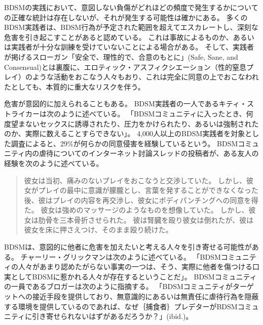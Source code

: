 \documentclass[paper=a4,book,openany]{jlreq}
\begin{document}
BDSMの実践において、意図しない負傷がどれほどの頻度で発生するかについての正確な統計は存在しないが、それが発生する可能性は確かにある。
多くのBDSM実践者は、BDSM行為が予定された範囲を超えてエスカレートし、深刻な危害を引き起こすことがあると認めている\citep[cf.][]{moser87:_explor_descr_study_sado_masoc_orien_sampl}。
これは事故によるものか、あるいは実践者が十分な訓練を受けていないことによる場合がある。
そして、実践者が掲げるスローガン「安全で、理性的で、合意のもとに」(Safe, Sane, and Consensual)とは裏腹に、エロティック・アスフィクシエーション（性的窒息プレイ）のような活動をおこなう人々もおり、これは完全に同意の上でおこなわれたとしても、本質的に重大なリスクを伴う\citep[pp.122-123]{busby12:_every_breat_you_take,downing07:_beyon_safet}。

危害が意図的に加えられることもある。
BDSM実践者の一人であるキティ・ストライカーは次のように述べている。
「BDSMコミュニティに入ったとき、何度望まないセックスに誘導されたり、圧力をかけられたり、あるいは強制されたのか、実際に数えることすらできない」\citep{striker11:_i_never_called_it_rape}。
4,000人以上のBDSM実践者を対象とした調査によると、29\%が何らかの同意侵害を経験しているという\citep{wright15:_consen_violat_survey}。
BDSMコミュニティ内の虐待についてのインターネット討論スレッドの投稿者が、ある友人の経験を次のように述べている。

\begin{quote}
彼女は当初、痛みのないプレイをおこなうと交渉していた。
しかし、彼女がプレイの最中に意識が朦朧とし、言葉を発することができなくなった後、彼はプレイの内容を再交渉し、彼女にボディパンチングへの同意を得た。
彼女は強めのマッサージのようなものを想像していた。
しかし、彼女は肋骨を三本骨折させられた。
彼は腎臓を殴り彼女は倒れたが、彼は彼女を床に押さえつけ、そのまま殴り続けた。
\citep{nick11:_bdsm_rape}
\end{quote}

BDSMは、意図的に他者に危害を加えたいと考える人々を引き寄せる可能性がある。
チャーリー・グリックマンは次のように述べている。
「BDSMコミュニティの人々があまり認めたがらない事実の一つは、そう、実際に他者を傷つける口実としてBDSMに惹かれる人々が存在するということだ」\citep{glickman11:_bdsm_rape}。
BDSMコミュニティの一員であるブロガーは次のように指摘する。
「BDSMコミュニティがターゲットへの接近手段を提供しており、無意識的にあるいは無責任に虐待行為を隠蔽する環境を提供しているのであれば、なぜ｛捕食者｝{プレデター}がBDSMコミュニティに引き寄せられないはずがあるだろうか？」(ibid.)。
\end{document}
